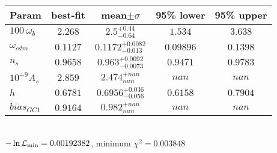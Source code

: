 \begin{tabular}{|l|c|c|c|c|} 
 \hline 
Param & best-fit & mean$\pm\sigma$ & 95\% lower & 95\% upper \\ \hline 
$100~\omega_{b }$ &$2.268$ & $2.5_{-0.64}^{+0.44}$ & $1.534$ & $3.638$ \\ 
$\omega_{cdm }$ &$0.1127$ & $0.1172_{-0.013}^{+0.0082}$ & $0.09896$ & $0.1398$ \\ 
$n_{s }$ &$0.9658$ & $0.963_{-0.0073}^{+0.0092}$ & $0.9471$ & $0.9783$ \\ 
$10^{+9}A_{s }$ &$2.859$ & $2.474_{nan}^{+nan}$ & $nan$ & $nan$ \\ 
$h$ &$0.6781$ & $0.6956_{-0.056}^{+0.036}$ & $0.6158$ & $0.7904$ \\ 
$bias_{GC 1 }$ &$0.9164$ & $0.982_{nan}^{+nan}$ & $nan$ & $nan$ \\ 
\hline 
 \end{tabular} \\ 
$-\ln{\cal L}_\mathrm{min} =0.00192382$, minimum $\chi^2=0.003848$ \\ 
